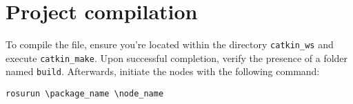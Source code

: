 \section{Project compilation}

To compile the file, ensure you're located within the directory \texttt{catkin\_ws} and execute \texttt{catkin\_make}. 
Upon successful completion, verify the presence of a folder named \texttt{build}. 
Afterwards, initiate the nodes with the following command:
\begin{verbatim}
rosurun \package_name \node_name
\end{verbatim}